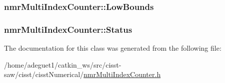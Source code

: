 \hypertarget{classnmr_multi_index_counter_a7f1542632d9d98971b5a00056acc2d6e}{
\subsubsection[{Low\-Bounds}]{ nmr\-Multi\-Index\-Counter\-::\-Low\-Bounds\hspace{0.3cm}{\ttfamily [protected]}}}\label{classnmr_multi_index_counter_a7f1542632d9d98971b5a00056acc2d6e}
\hypertarget{classnmr_multi_index_counter_a0faa71921d5ef62d074493438e3f3e9c}{
\subsubsection[{Status}]{ nmr\-Multi\-Index\-Counter\-::\-Status\hspace{0.3cm}{\ttfamily [protected]}}}\label{classnmr_multi_index_counter_a0faa71921d5ef62d074493438e3f3e9c}


The documentation for this class was generated from the following file\-:\begin{DoxyCompactItemize}
\item 
/home/adeguet1/catkin\-\_\-ws/src/cisst-\/saw/cisst/cisst\-Numerical/\hyperlink{nmr_multi_index_counter_8h}{nmr\-Multi\-Index\-Counter.\-h}\end{DoxyCompactItemize}
